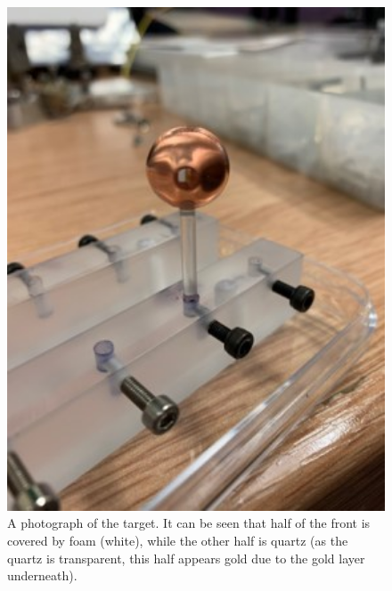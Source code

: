 \begin{figure}[ht]
\begin{centering}
\includegraphics[width=1.0\textwidth]{figures/AppendixExperiment/Target.jpg}%
\caption{\label{fig:Appx-Target} A photograph of the target. It can be seen that half of the front is covered by foam (white), while the other half is quartz (as the quartz is transparent, this half appears gold due to the gold layer underneath).}
\end{centering}
\end{figure}

